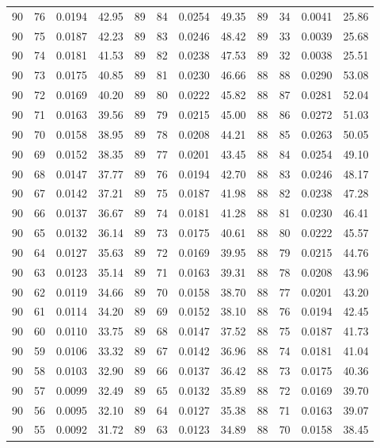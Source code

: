\begin{tabular}{llll|llll|llll}
90 & 76 & 0.0194 & 42.95 & 89 & 84 & 0.0254 & 49.35 & 89 & 34 & 0.0041 & 25.86\\
90 & 75 & 0.0187 & 42.23 & 89 & 83 & 0.0246 & 48.42 & 89 & 33 & 0.0039 & 25.68\\
90 & 74 & 0.0181 & 41.53 & 89 & 82 & 0.0238 & 47.53 & 89 & 32 & 0.0038 & 25.51\\
90 & 73 & 0.0175 & 40.85 & 89 & 81 & 0.0230 & 46.66 & 88 & 88 & 0.0290 & 53.08\\
90 & 72 & 0.0169 & 40.20 & 89 & 80 & 0.0222 & 45.82 & 88 & 87 & 0.0281 & 52.04\\
90 & 71 & 0.0163 & 39.56 & 89 & 79 & 0.0215 & 45.00 & 88 & 86 & 0.0272 & 51.03\\
90 & 70 & 0.0158 & 38.95 & 89 & 78 & 0.0208 & 44.21 & 88 & 85 & 0.0263 & 50.05\\
90 & 69 & 0.0152 & 38.35 & 89 & 77 & 0.0201 & 43.45 & 88 & 84 & 0.0254 & 49.10\\
90 & 68 & 0.0147 & 37.77 & 89 & 76 & 0.0194 & 42.70 & 88 & 83 & 0.0246 & 48.17\\
90 & 67 & 0.0142 & 37.21 & 89 & 75 & 0.0187 & 41.98 & 88 & 82 & 0.0238 & 47.28\\
90 & 66 & 0.0137 & 36.67 & 89 & 74 & 0.0181 & 41.28 & 88 & 81 & 0.0230 & 46.41\\
90 & 65 & 0.0132 & 36.14 & 89 & 73 & 0.0175 & 40.61 & 88 & 80 & 0.0222 & 45.57\\
90 & 64 & 0.0127 & 35.63 & 89 & 72 & 0.0169 & 39.95 & 88 & 79 & 0.0215 & 44.76\\
90 & 63 & 0.0123 & 35.14 & 89 & 71 & 0.0163 & 39.31 & 88 & 78 & 0.0208 & 43.96\\
90 & 62 & 0.0119 & 34.66 & 89 & 70 & 0.0158 & 38.70 & 88 & 77 & 0.0201 & 43.20\\
90 & 61 & 0.0114 & 34.20 & 89 & 69 & 0.0152 & 38.10 & 88 & 76 & 0.0194 & 42.45\\
90 & 60 & 0.0110 & 33.75 & 89 & 68 & 0.0147 & 37.52 & 88 & 75 & 0.0187 & 41.73\\
90 & 59 & 0.0106 & 33.32 & 89 & 67 & 0.0142 & 36.96 & 88 & 74 & 0.0181 & 41.04\\
90 & 58 & 0.0103 & 32.90 & 89 & 66 & 0.0137 & 36.42 & 88 & 73 & 0.0175 & 40.36\\
90 & 57 & 0.0099 & 32.49 & 89 & 65 & 0.0132 & 35.89 & 88 & 72 & 0.0169 & 39.70\\
90 & 56 & 0.0095 & 32.10 & 89 & 64 & 0.0127 & 35.38 & 88 & 71 & 0.0163 & 39.07\\
90 & 55 & 0.0092 & 31.72 & 89 & 63 & 0.0123 & 34.89 & 88 & 70 & 0.0158 & 38.45\\

\end{tabular}
